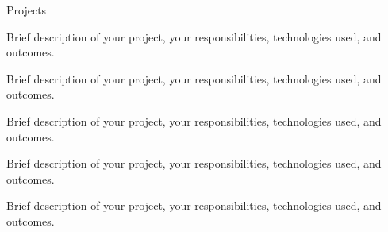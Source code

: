 \begin{rubric}{Projects}

\entry* Brief description of your project, your responsibilities, technologies used, and outcomes.

\entry* Brief description of your project, your responsibilities, technologies used, and outcomes.

\entry* Brief description of your project, your responsibilities, technologies used, and outcomes.

\entry* Brief description of your project, your responsibilities, technologies used, and outcomes.

\entry* Brief description of your project, your responsibilities, technologies used, and outcomes.

\end{rubric}